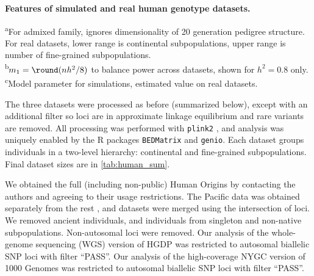 \documentclass[11pt]{article}
\begin{document}
\begin{linenumbers}
\begin{table}[b!]
  \centering
  \footnotesize
  \caption{
    \textbf{Features of simulated and real human genotype datasets.}
  }
  \label{tab:human_sum}
  \begin{flushleft} 
    \textsuperscript{a}For admixed family, ignores dimensionality of 20 generation pedigree structure.
    For real datasets, lower range is continental subpopulations, upper range is number of fine-grained subpopulations.\\
    \textsuperscript{b}$m_1 = \round( n h^2 / 8 )$ to balance power across datasets, shown for $h^2=0.8$ only.\\
    \textsuperscript{c}Model parameter for simulations, estimated value on real datasets.
  \end{flushleft}
\end{table}

The three datasets were processed as before \citep{ochoa_new_2019} (summarized below), except with an additional filter so loci are in approximate linkage equilibrium and rare variants are removed.
All processing was performed with \texttt{plink2} \citep{chang_second-generation_2015}, and analysis was uniquely enabled by the R packages \texttt{BEDMatrix} \citep{grueneberg_bgdata_2019} and \texttt{genio}.
Each dataset groups individuals in a two-level hierarchy: continental and fine-grained subpopulations.
Final dataset sizes are in \cref{tab:human_sum}.

We obtained the full (including non-public) Human Origins by contacting the authors and agreeing to their usage restrictions.
The Pacific data \citep{skoglund_genomic_2016} was obtained separately from the rest \citep{lazaridis_ancient_2014,lazaridis_genomic_2016}, and datasets were merged using the intersection of loci.
We removed ancient individuals, and individuals from singleton and non-native subpopulations.
Non-autosomal loci were removed.
Our analysis of the whole-genome sequencing (WGS) version of HGDP \citep{bergstrom_insights_2020} was restricted to autosomal biallelic SNP loci with filter ``PASS''.
Our analysis of the high-coverage NYGC version of 1000 Genomes \citep{fairley_international_2020} was restricted to autosomal biallelic SNP loci with filter ``PASS''.


\end{linenumbers}
\end{document}
